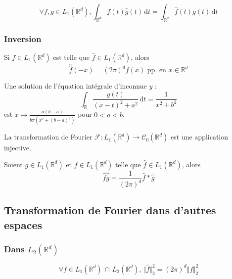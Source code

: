   \begin{theorem}
    \[ \forall f, g \in L_1(\mathbb{R}^d), \int_{\mathbb{R}^d} f(t) \widehat{g}(t) \, \mathrm{d}t = \int_{\mathbb{R}^d} \widehat{f}(t) g(t) \, \mathrm{d}t \]
  \end{theorem}

  \subsubsection{Inversion}

  \begin{theorem}
    Si $f \in L_1(\mathbb{R}^d)$ est telle que $\widehat{f} \in L_1(\mathbb{R}^d)$, alors
    \[ \widehat{\widehat{f}}(-x) = (2\pi)^d f(x) \text{ pp. en } x \in \mathbb{R}^d \]
  \end{theorem}

  \begin{example}
    Une solution de l'équation intégrale d'inconnue $y$ :
    \[ \int_{\mathbb{R}} \frac{y(t)}{(x-t)^2 + a^2} \, \mathrm{d}t = \frac{1}{x^2 + b^2} \]
    est $x \mapsto \frac{a(b-a)}{b \pi (x^2 + (b-a)^2)}$ pour $0 < a < b$.
  \end{example}

  \begin{corollary}
    La transformation de Fourier $\mathcal{F} : L_1(\mathbb{R}^d) \rightarrow \mathcal{C}_0(\mathbb{R}^d)$ est une application injective.
  \end{corollary}

  \begin{proposition}
    Soient $g \in L_1(\mathbb{R}^d)$ et $f \in L_1(\mathbb{R}^d)$ telle que $\widehat{f} \in L_1(\mathbb{R}^d)$, alors
    \[ \widehat{fg} = \frac{1}{(2\pi)^d} \widehat{f} * \widehat{g} \]
  \end{proposition}

  \subsection{Transformation de Fourier dans d'autres espaces}

  \subsubsection{Dans \texorpdfstring{$L_2(\mathbb{R}^d)$}{L₂(Rᵈ)}}


  \begin{theorem}
    \[ \forall f \in L_1(\mathbb{R}^d) \, \cap \, L_2(\mathbb{R}^d), \, \Vert \widehat{f} \Vert^2_2 = (2 \pi)^d \Vert f \Vert^2_2 \]
  \end{theorem}

